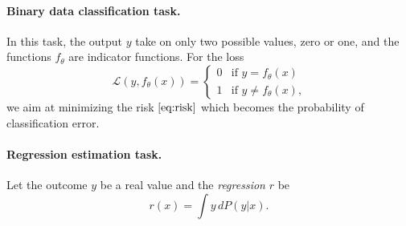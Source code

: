 \paragraph{Binary data classification task.}  In this task, the output $y$ take on
only two possible values, zero or one, and the functions $f_\theta$ are indicator
functions. For the loss
\begin{equation*}
  \mathcal{L}(y, f_\theta(x)) = \begin{cases}
    0 & \text{if } y = f_\theta(x) \\
    1 & \text{if } y \neq f_\theta(x)\text{,}
  \end{cases}
\end{equation*}
we aim at minimizing the risk $\eqref{eq:risk}$ which becomes the probability of
classification error.

\paragraph{Regression estimation task.} Let the outcome $y$ be a real value and
the \emph{regression} $r$ be $$r(x) = \int y\, dP(y|x) \text{.}$$
